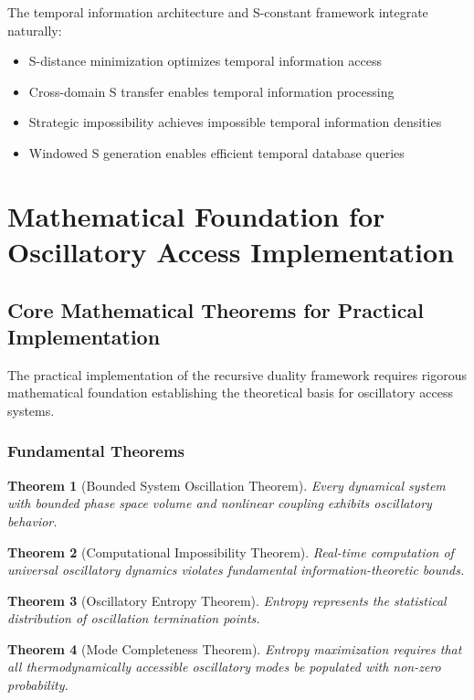 \documentclass[12pt,a4paper]{article}
\newtheorem{theorem}{Theorem}[section]
\begin{document}
{{{{{{{{{{{{{{The temporal information architecture and S-constant framework integrate naturally:

\begin{itemize}
\item S-distance minimization optimizes temporal information access
\item Cross-domain S transfer enables temporal information processing
\item Strategic impossibility achieves impossible temporal information densities
\item Windowed S generation enables efficient temporal database queries
\end{itemize}

\section{Mathematical Foundation for Oscillatory Access Implementation}

\subsection{Core Mathematical Theorems for Practical Implementation}

The practical implementation of the recursive duality framework requires rigorous mathematical foundation establishing the theoretical basis for oscillatory access systems.

\subsubsection{Fundamental Theorems}

\begin{theorem}[Bounded System Oscillation Theorem]
Every dynamical system with bounded phase space volume and nonlinear coupling exhibits oscillatory behavior.
\end{theorem}

\begin{theorem}[Computational Impossibility Theorem]
Real-time computation of universal oscillatory dynamics violates fundamental information-theoretic bounds.
\end{theorem}

\begin{theorem}[Oscillatory Entropy Theorem]
Entropy represents the statistical distribution of oscillation termination points.
\end{theorem}

\begin{theorem}[Mode Completeness Theorem]
Entropy maximization requires that all thermodynamically accessible oscillatory modes be populated with non-zero probability.
\end{theorem}

}}}}}}}}}}}}}}
\end{document}
